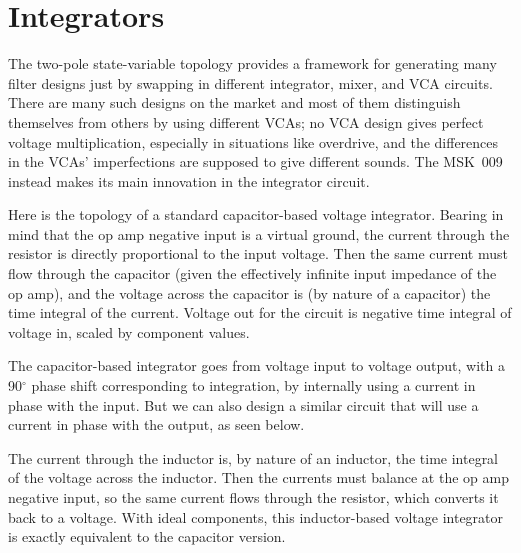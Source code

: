 
\section{Integrators}

The two-pole state-variable topology provides a framework for generating
many filter designs just by swapping in different integrator, mixer, and VCA
circuits.  There are many such designs on the market and most of them
distinguish themselves from others by using different VCAs; no VCA design
gives perfect voltage multiplication, especially in situations like
overdrive, and the differences in the VCAs' imperfections are supposed to
give different sounds.  The MSK~009 instead makes its main innovation in the
integrator circuit.

Here is the topology of a standard capacitor-based voltage integrator. 
Bearing in mind that the op amp negative input is a virtual ground, the
current through the resistor is directly proportional to the input voltage. 
Then the same current must flow through the capacitor (given the effectively
infinite input impedance of the op amp), and the voltage across the
capacitor is (by nature of a capacitor) the time integral of the current. 
Voltage out for the circuit is negative time integral of voltage in, scaled
by component values.

\vspace{0.5\baselineskip}
{\centering\par}

The capacitor-based integrator goes from voltage input to voltage output,
with a 90$^\circ$ phase shift corresponding to integration, by internally
using a current in phase with the input.  But we can also design a similar
circuit that will use a current in phase with the output, as seen below.

\vspace{0.5\baselineskip}
{\centering\par}

The current through the inductor is, by nature of an inductor, the time
integral of the voltage across the inductor.  Then the currents must balance
at the op amp negative input, so the same current flows through the
resistor, which converts it back to a voltage.  With ideal components, this
inductor-based voltage integrator is exactly equivalent to the capacitor
version.

